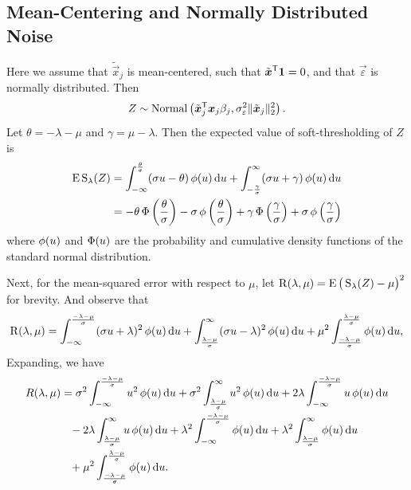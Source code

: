 \subsection{Mean-Centering and Normally Distributed Noise}

Here we assume that \(\tilde{\vec{x}}_j\) is mean-centered, such that \(\tilde{\boldsymbol{x}}^{\mathsf{T}} \boldsymbol{1} = 0\), and that \(\vec{\varepsilon}\) is normally distributed. Then
\[
  Z \sim \operatorname{Normal}\left(\tilde{\boldsymbol{x}}_j^{\mathsf{T}}\boldsymbol{x}_j \beta_j, \sigma_\varepsilon^2 \lVert \tilde{\boldsymbol{x}}_j\rVert_2^2 \right).
\]
Let \(\theta = -\lambda - \mu\) and \(\gamma = \mu - \lambda\). Then the expected value of soft-thresholding of \(Z\) is
\begin{align}
  \label{eq:mean-centered-eval}
  \operatorname{E} \operatorname{S}_\lambda(Z) & = \int_{-\infty}^\frac{\theta}{\sigma} (\sigma u - \theta) \operatorname{\phi}(u) \mathop{}\!\mathrm{d} u + \int_{-\frac{\gamma}{\sigma}}^\infty (\sigma u + \gamma) \operatorname{\phi}(u) \mathop{}\!\mathrm{d} u                                                \\
                    & = -\theta \operatorname{\Phi}\left(\frac{\theta}{\sigma}\right) - \sigma \operatorname{\phi}\left(\frac{\theta}{\sigma}\right) + \gamma \operatorname{\Phi}\left(\frac{\gamma}{\sigma}\right) + \sigma \operatorname{\phi}\left(\frac{\gamma}{\sigma}\right)
\end{align}
where \(\operatorname{\phi}(u)\) and \(\operatorname{\Phi}(u)\) are the probability and cumulative density functions of the standard normal distribution.

Next, for the mean-squared error with respect to \(\mu\), let \(\operatorname{R}(\lambda, \mu) = \operatorname{E} \big(\operatorname{S}_\lambda(Z) - \mu\big)^2\) for brevity. And observe that
\[
  \operatorname{R}(\lambda, \mu) = \int_{-\infty}^\frac{-\lambda - \mu}{\sigma} (\sigma u + \lambda)^2 \operatorname{\phi}(u)\mathop{}\!\mathrm{d} u +
  \int_{\frac{\lambda - \mu}{\sigma}}^\infty (\sigma u - \lambda)^2 \operatorname{\phi}(u)\mathop{}\!\mathrm{d} u + \mu^2 \int_{\frac{-\lambda - \mu}{\sigma}}^{\frac{\lambda - \mu}{\sigma}} \operatorname{\phi}(u)\mathop{}\!\mathrm{d} u,
\]
Expanding, we have
\[
  \begin{aligned}
    R(\lambda,\mu) & = \sigma^2 \int_{-\infty}^\frac{-\lambda - \mu}{\sigma} u^2 \operatorname{\phi}(u)\mathop{}\!\mathrm{d} u + \sigma^2 \int_\frac{\lambda - \mu}{\sigma}^\infty u^2 \operatorname{\phi}(u)\mathop{}\!\mathrm{d} u + 2\lambda \int_{-\infty}^\frac{-\lambda - \mu}{\sigma} u \operatorname{\phi}(u)\mathop{}\!\mathrm{d} u \\
                   & \phantom{=} - 2\lambda \int_\frac{\lambda - \mu}{\sigma}^{\infty} u \operatorname{\phi}(u)\mathop{}\!\mathrm{d} u + \lambda^2 \int_{-\infty}^\frac{-\lambda-\mu}{\sigma} \operatorname{\phi}(u)\mathop{}\!\mathrm{d} u + \lambda^2 \int_\frac{\lambda-\mu}{\sigma}^\infty \operatorname{\phi}(u)\mathop{}\!\mathrm{d} u \\
                   & \phantom{=} + \mu^2 \int_\frac{-\lambda - \mu}{\sigma}^\frac{\lambda - \mu}{\sigma} \operatorname{\phi}(u) \mathop{}\!\mathrm{d} u.
  \end{aligned}
\]

